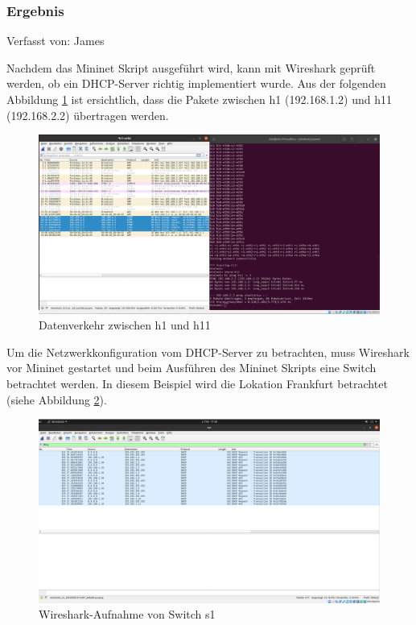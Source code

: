 \documentclass[fontsize=12pt,paper=a4,open=any,parskip=half,
  twoside=false,toc=listof,toc=bibliography,fleqn,leqno,
  captions=nooneline,captions=tableabove,british]{scrbook}
\begin{document}
\subsubsection{Ergebnis}
{\tiny Verfasst von: James\par}
Nachdem das Mininet Skript ausgeführt wird, kann mit Wireshark geprüft werden, ob ein DHCP-Server richtig implementiert wurde. Aus der folgenden Abbildung \ref{wireshark} ist ersichtlich, dass die Pakete zwischen h1 (192.168.1.2) und h11 (192.168.2.2) übertragen werden.
\begin{figure}[H]
 \centering
 \includegraphics[width=1.0\textwidth]{Bilder/wireshark2}
 \captionsetup{justification=centering}
 \caption{Datenverkehr zwischen h1 und h11}
 \label{wireshark}
\end{figure}

Um die Netzwerkkonfiguration vom DHCP-Server zu betrachten, muss Wireshark vor Mininet gestartet und beim Ausführen des Mininet Skripts eine Switch betrachtet werden. In diesem Beispiel wird die Lokation Frankfurt betrachtet (siehe Abbildung \ref{s1}).

\begin{figure}[H]
 \centering
 \includegraphics[width=1.0\textwidth]{Bilder/s1}
 \captionsetup{justification=centering}
 \caption{Wireshark-Aufnahme von Switch s1}
 \label{s1}
\end{figure}
\end{document}
